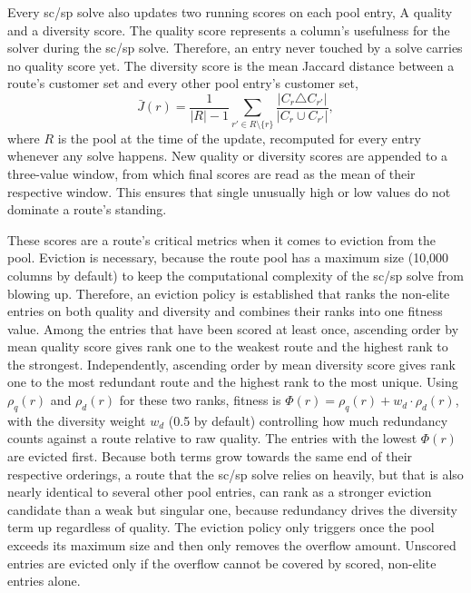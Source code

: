 Every \gls{sc}/\gls{sp} solve also updates two running scores on each pool entry, A quality and a diversity score. The quality score represents a column's usefulness for the solver during the \gls{sc}/\gls{sp} solve. Therefore, an entry never touched by a solve carries no quality score yet. The diversity score is the mean Jaccard distance \citep{jaccardDistributionFloreAlpine1901} between a route's customer set and every other pool entry's customer set,
\begin{equation}
\bar{J}(r) = \frac{1}{|R| - 1} \sum_{r' \in R \setminus \{r\}} \frac{|C_r \triangle C_{r'}|}{|C_r \cup C_{r'}|},
\label{eq:route-diversity}
\end{equation}
where $R$ is the pool at the time of the update, recomputed for every entry whenever any solve happens. New quality or diversity scores are appended to a three-value window, from which final scores are read as the mean of their respective window. This ensures that single unusually high or low values do not dominate a route's standing.

These scores are a route's critical metrics when it comes to eviction from the pool. Eviction is necessary, because the route pool has a maximum size (10,000 columns by default) to keep the computational complexity of the \gls{sc}/\gls{sp} solve from blowing up. Therefore, an eviction policy is established that ranks the non-elite entries on both quality and diversity and combines their ranks into one fitness value. Among the entries that have been scored at least once, ascending order by mean quality score gives rank one to the weakest route and the highest rank to the strongest. Independently, ascending order by mean diversity score gives rank one to the most redundant route and the highest rank to the most unique. Using $\rho_q(r)$ and $\rho_d(r)$ for these two ranks, fitness is $\Phi(r) = \rho_q(r) + w_d \cdot \rho_d(r)$, with the diversity weight $w_d$ (0.5 by default) controlling how much redundancy counts against a route relative to raw quality. The entries with the lowest $\Phi(r)$ are evicted first. Because both terms grow towards the same end of their respective orderings, a route that the \gls{sc}/\gls{sp} solve relies on heavily, but that is also nearly identical to several other pool entries, can rank as a stronger eviction candidate than a weak but singular one, because redundancy drives the diversity term up regardless of quality. The eviction policy only triggers once the pool exceeds its maximum size and then only removes the overflow amount. Unscored entries are evicted only if the overflow cannot be covered by scored, non-elite entries alone.

